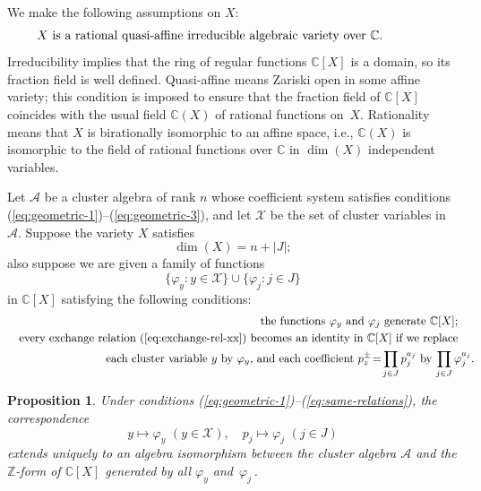\documentclass[letterpaper]{amsart}
\numberwithin{equation}{section}
\newtheorem{proposition}[theorem]{Proposition}
\theoremstyle{definition}
\def\AA{\mathcal{A}}
\def\ZZ{\mathbb{Z}}
\def\CC{\mathbb{C}}
\begin{document}
We make the following assumptions on $X$: 
\begin{equation} 
\label{eq:X-rational-etc} 
\text{$X$ is a rational quasi-affine irreducible algebraic variety 
over $\CC$.} \hspace{.5in} 
\end{equation} 
Irreducibility implies that the ring of regular functions $\CC[X]$ is a 
domain, so its fraction field is well defined. 
Quasi-affine means Zariski open in some affine variety; 
this condition is imposed to ensure that the fraction field of 
$\CC[X]$ coincides with the usual field $\CC(X)$ of rational functions 
on~$X$. 
Rationality means that $X$ is birationally isomorphic 
to an affine space, i.e., 
$\CC(X)$ 
is isomorphic to the field of rational functions 
over $\CC$ in $\dim (X)$ independent variables. 
 
Let $\AA$ be a cluster algebra  of rank $n$ whose coefficient 
system satisfies conditions (\ref{eq:geometric-1})--(\ref{eq:geometric-3}), and 
let $\mathcal{X}$ be the set of cluster variables in~$\AA$. 
Suppose the variety $X$ satisfies 
\begin{equation} 
\label{eq:X-dimension} 
\dim (X) = n + |J|; 
\end{equation} 
also suppose we are given a family of functions 
$$\{\varphi_y : y \in \mathcal{X}\} \cup 
\{\varphi_j : j \in J\}$$ 
in $\CC[X]$ satisfying the following conditions: 
\begin{eqnarray} 
\label{eq:phi-generate-X} 
&&\text{the functions $\varphi_y$ and $\varphi_j$ 
generate~$\CC[X]$;}\\ 
\label{eq:same-relations} 
&&\text{every exchange relation (\ref{eq:exchange-rel-xx}) becomes 
an identity in $\CC[X]$ if we replace}\\ 
\nonumber 
&&\text{each cluster 
variable $y$ by $\varphi_y$, and each coefficient $p_z^\pm \!=\! \prod_{j 
  \in J} p_j^{a_j}$ by $\prod_{j \in J} \varphi_j^{a_j}$.} \hspace{-.2in} 
\end{eqnarray} 
 
 
\begin{proposition} 
\label{pr:geom-realization-criterion} 
Under conditions {\rm (\ref{eq:geometric-1})--(\ref{eq:same-relations})}, 
the correspondence 
\begin{equation} 
\label{eq:varphi} 
y \mapsto \varphi_y \,\, (y \in \mathcal{X}), 
\quad p_j \mapsto \varphi_j \,\, (j \in J) 
\end{equation} 
extends uniquely to an algebra isomorphism between the cluster algebra 
$\AA$ and the $\ZZ$-form of $\CC[X]$ generated by all $\varphi_y$ 
and~$\varphi_j\,$. 
\end{proposition} 
 
\end{document}
